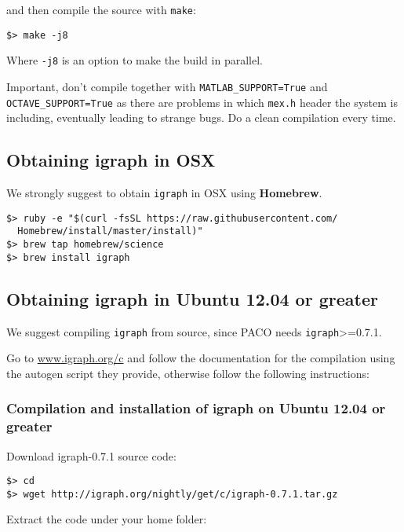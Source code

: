\documentclass[11pt,%
              a4paper,%
]{article}
\begin{document}
and then compile the source with \texttt{make}:

\begin{verbatim}
$> make -j8
\end{verbatim}
Where \texttt{-j8} is an option to make the build in parallel.

Important, don't compile together with \texttt{MATLAB\_SUPPORT=True} and \texttt{OCTAVE\_SUPPORT=True} as there are problems in which \texttt{mex.h} header the system is including, eventually leading to strange bugs. Do a clean compilation every time.

\subsection{Obtaining igraph in OSX}\label{obtaining-igraph-in-osx}

We strongly suggest to obtain \texttt{igraph} in OSX using
\textbf{Homebrew}.

\begin{verbatim}
$> ruby -e "$(curl -fsSL https://raw.githubusercontent.com/
  Homebrew/install/master/install)"
$> brew tap homebrew/science
$> brew install igraph
\end{verbatim}

\subsection{Obtaining igraph in Ubuntu 12.04 or
greater}

We suggest compiling \texttt{igraph} from source, since PACO needs
\texttt{igraph}\textgreater{}=0.7.1.

Go to \url{www.igraph.org/c} and follow the documentation for the compilation using the autogen script they provide, otherwise follow the following instructions:

\subsubsection{Compilation and installation of igraph on Ubuntu 12.04 or
greater}\label{compilation-and-installation-of-igraph-on-ubuntu-12.04-or-greater}

Download igraph-0.7.1 source code:

\begin{verbatim}
$> cd
$> wget http://igraph.org/nightly/get/c/igraph-0.7.1.tar.gz
\end{verbatim}
Extract the code under your home folder:
\end{document}
